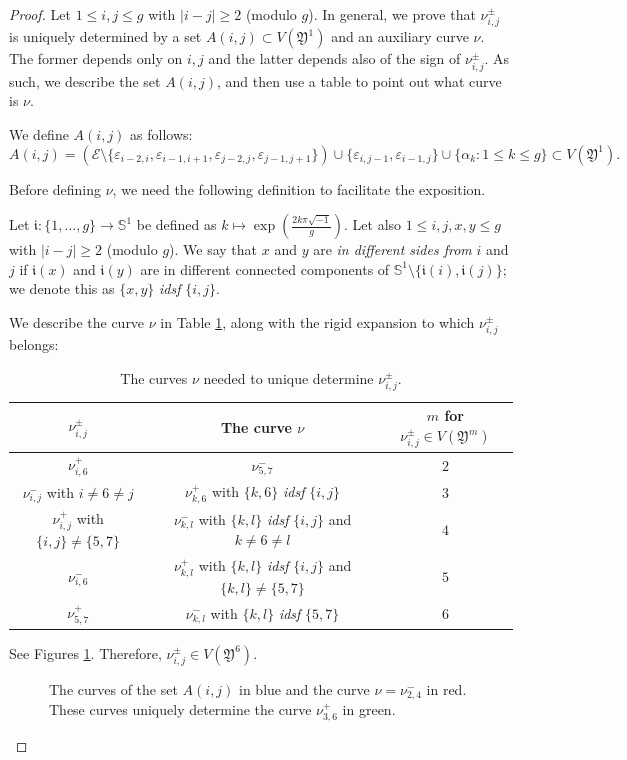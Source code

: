 \documentclass[10pt,a4paper]{amsart}
\newcommand{\E}{\mathcal{E}}
\newcommand*{\Y}{\mathfrak{Y}}
\newcommand*{\veps}{\varepsilon}
\begin{document}
\begin{proof}
Let $1 \leq i,j \leq g$ with $|i-j|\geq 2$ (modulo $g$). In general, we prove that $\nu^{\pm}_{i,j}$ is uniquely determined by a set $A(i,j) \subset V(\Y^{1})$ and an auxiliary curve $\nu$. The former depends only on $i,j$ and the latter depends also of the sign of $\nu^{\pm}_{i,j}$. As such, we describe the set $A(i,j)$, and then use a table to point out what curve is $\nu$.

We define $A(i,j)$ as follows: $$A(i,j) = (\E \setminus \{\veps_{i-2,i},\veps_{i-1,i+1},\veps_{j-2,j},\veps_{j-1,j+1}\}) \cup \{\veps_{i,j-1},\veps_{i-1,j}\} \cup \{\alpha_{k} : 1 \leq k \leq g\} \subset V(\Y^{1}).$$

Before defining $\nu$, we need the following definition to facilitate the exposition.

Let $\mathfrak{i}: \{1, \ldots, g\} \to \mathbb{S}^{1}$ be defined as $k \mapsto \exp(\frac{2k\pi \sqrt{-1}}{g})$. Let also $1 \leq i,j,x,y \leq g$ with $|i-j|\geq 2$ (modulo $g$). We say that $x$ and $y$ are \textit{in different sides from} $i$ and $j$ if $\mathfrak{i}(x)$ and $\mathfrak{i}(y)$ are in different connected components of $\mathbb{S}^{1} \setminus \{\mathfrak{i}(i), \mathfrak{i}(j)\}$; we denote this as $\{x,y\}$ \emph{idsf} $\{i,j\}$.

We describe the curve $\nu$ in Table \ref{table:nu}, along with the rigid expansion to which $\nu^{\pm}_{i,j}$ belongs:

\begin{table}[ht]
 \centering
 \begin{tabular}{|c|c|c|}
  \hline
  $\nu^{\pm}_{i,j}$ & The curve $\nu$ & $m$ for $\nu^{\pm}_{i,j} \in V(\Y^{m})$\\ \hline
  $\nu^{+}_{i,6}$ & $\nu^{-}_{5,7}$ & $2$\\ \hline
  $\nu^{-}_{i,j}$ with $i \neq 6 \neq j$ & $\nu^{+}_{k,6}$ with $\{k,6\}$ \emph{idsf} $\{i,j\}$ & $3$\\ \hline
  $\nu^{+}_{i,j}$ with $\{i,j\} \neq \{5,7\}$ & $\nu^{-}_{k,l}$ with $\{k,l\}$ \emph{idsf} $\{i,j\}$ and $k \neq 6 \neq l$ & $4$\\ \hline
  $\nu^{-}_{i,6}$ & $\nu^{+}_{k,l}$ with $\{k,l\}$ \emph{idsf} $\{i,j\}$ and $\{k,l\}\neq\{5,7\}$ & $5$\\ \hline
  $\nu^{+}_{5,7}$ & $\nu^{-}_{k,l}$ with $\{k,l\}$ \emph{idsf} $\{5,7\}$ & $6$\\ \hline
 \end{tabular}
 \caption{The curves $\nu$ needed to unique determine $\nu^{\pm}_{i,j}$.}\label{table:nu}
\end{table}

See Figures \ref{fig:udet-nupmij}. Therefore, $\nu^{\pm}_{i,j} \in V(\Y^{6})$.
\begin{figure}[ht]
  \centering
  \caption{The curves of the set $A(i,j)$ in blue and the curve $\nu = \nu^{-}_{2,4}$ in red. These curves uniquely determine the curve $\nu^{+}_{3,6}$ in green.}\label{fig:udet-nupmij}
 \end{figure}
\end{proof}
\end{document}
